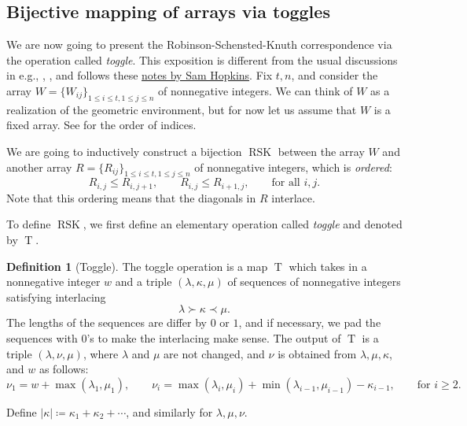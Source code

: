 \documentclass[letterpaper,11pt,oneside,reqno]{article}
\numberwithin{equation}{section}
\theoremstyle{definition}
\newtheorem{definition}[proposition]{Definition}
\begin{document}
\subsection{Bijective mapping of arrays via toggles}
\label{sub:toggle}

We are now going to present the Robinson-Schensted-Knuth
correspondence via the operation called \emph{toggle}.
This exposition is different from the usual discussions in e.g.,
\cite{sagan2001symmetric}, \cite{fulton1997young},
and follows these \href{https://www.samuelfhopkins.com/docs/rsk.pdf}{notes by Sam Hopkins}.
Fix $t,n$, and consider the array $W=\{W_{ij}\}_{1\le i\le t, 1\le j\le n}$ of
nonnegative integers. We can think of $W$ as a realization of the geometric
environment, but for now let us assume that $W$ is a fixed array. See
 for the order of indices.

We are going to inductively construct a bijection $\operatorname{RSK}$ between the array $W$ and another
array $R=\{R_{ij}\}_{1\le i\le t, 1\le j\le n}$ of nonnegative integers, which is
\emph{ordered}:
\begin{equation*}
	R_{i,j} \le R_{i,j+1}, \qquad R_{i,j} \le R_{i+1,j},\qquad \text{for all } i,j.
\end{equation*}
Note that this ordering means that the diagonals in $R$ interlace.

To define $\operatorname{RSK}$, we first define an elementary
operation called \emph{toggle} and denoted by $\operatorname{T}$.

\begin{definition}[Toggle]
	The toggle operation is a map $\operatorname{T}$ which takes in
	a nonnegative integer $w$ and
	a triple $(\lambda,\kappa,\mu)$ of sequences of nonnegative integers
	satisfying interlacing
	\begin{equation*}
		\lambda\succ \kappa\prec \mu.
	\end{equation*}
	The lengths of the sequences are differ by $0$ or $1$, and if necessary, we pad the
	sequences with $0$'s to make the interlacing make sense.
	The output of $\operatorname{T}$ is a triple $(\lambda,\nu,\mu)$, where
	$\lambda$ and $\mu$ are not changed, and $\nu$ is obtained from $\lambda,\mu,\kappa$,
	and $w$ as follows:
	\begin{equation*}
		\nu_1=w+\max(\lambda_1,\mu_1),\qquad
		\nu_i=\max(\lambda_{i},\mu_i)+\min(\lambda_{i-1},\mu_{i-1})-\kappa_{i-1},\qquad
		\text{for } i\ge 2.
	\end{equation*}
\end{definition}
Define $|\kappa|\coloneqq \kappa_1+\kappa_2+\cdots$, and similarly for
$\lambda,\mu,\nu$.
\end{document}
